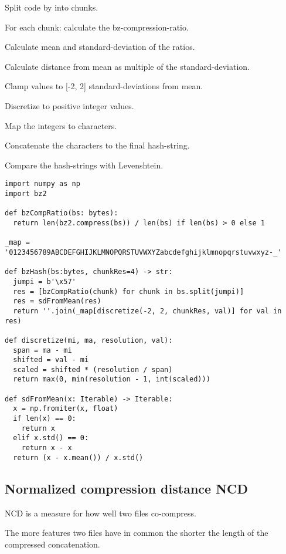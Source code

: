 \documentclass[../main.tex]{subfiles}
\begin{document}
\begin{ol}
  \item Split code by  into chunks.
  \item For each chunk: calculate the bz-compression-ratio.
  \item Calculate mean and standard-deviation of the ratios.
  \item Calculate distance from mean as multiple of the standard-deviation.
  \item Clamp values to [-2, 2] standard-deviations from mean.
  \item Discretize to positive integer values.
  \item Map the integers to characters.
  \item Concatenate the characters to the final hash-string.
  \item Compare the hash-strings with Levenshtein.
\end{ol}

\begin{lstlisting}[style=pymd]
import numpy as np
import bz2

def bzCompRatio(bs: bytes):
  return len(bz2.compress(bs)) / len(bs) if len(bs) > 0 else 1

_map = '0123456789ABCDEFGHIJKLMNOPQRSTUVWXYZabcdefghijklmnopqrstuvwxyz-_'

def bzHash(bs:bytes, chunkRes=4) -> str:
  jumpi = b'\x57'
  res = [bzCompRatio(chunk) for chunk in bs.split(jumpi)]
  res = sdFromMean(res)
  return ''.join(_map[discretize(-2, 2, chunkRes, val)] for val in res)

def discretize(mi, ma, resolution, val):
  span = ma - mi
  shifted = val - mi
  scaled = shifted * (resolution / span)
  return max(0, min(resolution - 1, int(scaled)))

def sdFromMean(x: Iterable) -> Iterable:
  x = np.fromiter(x, float)
  if len(x) == 0:
    return x
  elif x.std() == 0:
    return x - x
  return (x - x.mean()) / x.std()
\end{lstlisting}

\subsection{Normalized compression distance NCD}

NCD is a measure for how well two files co-compress.

The more features two files have in common the shorter the length of the compressed concatenation.
\end{document}
